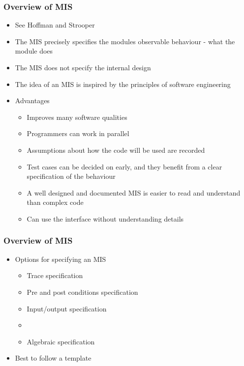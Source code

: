 \documentclass[t, 12pt, numbers, fleqn, handout]{beamer}
\begin{document}

\begin{frame}
\frametitle{Overview of MIS}
\begin{itemize}
\item See Hoffman and Strooper \cite{HoffmanAndStrooper1995}
\item The MIS precisely specifies the modules observable behaviour - what the module does
\item The MIS does not specify the internal design
\item The idea of an MIS is inspired by the principles of software engineering
\item Advantages
\begin{itemize}
\item Improves many software qualities
\item Programmers can work in parallel
\item Assumptions about how the code will be used are recorded
\item Test cases can be decided on early, and they benefit from a clear specification of the behaviour
\item A well designed and documented MIS is easier to read and understand than complex code
\item Can use the interface without understanding details
\end{itemize}
\end{itemize}
\end{frame}


\begin{frame}
\frametitle{Overview of MIS}
\begin{itemize}
\item Options for specifying an MIS
\begin{itemize}
\item Trace specification
\item Pre and post conditions specification
\item Input/output specification
\item {}
\item Algebraic specification
\end{itemize}
\item Best to follow a template
\end{itemize}
\end{frame}
\end{document}
